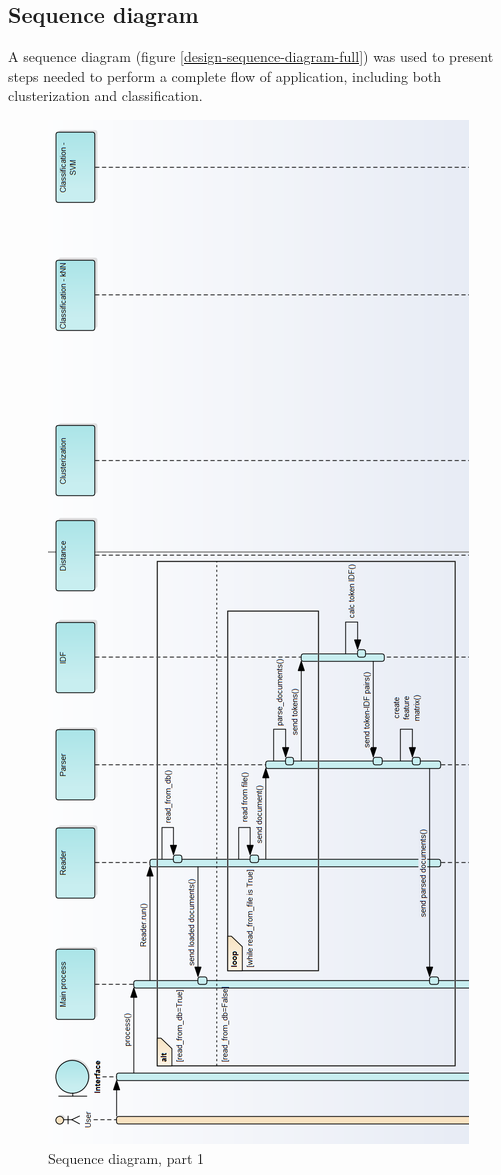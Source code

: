 \subsection{Sequence diagram}
A sequence diagram (figure \ref{design-sequence-diagram-full}) was used to present steps needed to perform a complete flow of application, including both clusterization and classification.

\begin{figure}[H]
	\begin{center}
		\includegraphics[width=0.6\linewidth]{images/diagrams/seq1-h.png}
		\caption{Sequence diagram, part 1}
		\label{design-sequence-diagram-1}
	\end{center}
\end{figure}


